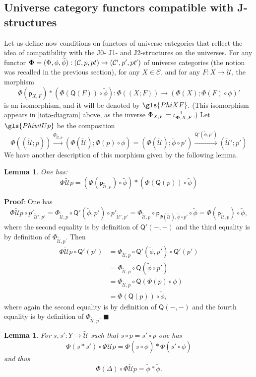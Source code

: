 \documentclass[12pt]{article}
\numberwithin{equation}{section}
\newenvironment{myproof}{{\bf Proof}:}{$\blacksquare$ \vskip 5mm }
\newtheorem{lemma}[proposition]{Lemma}
\newcommand{\sr}{\rightarrow}
\newcommand{\lr}{\longrightarrow}
\newcommand{\wt}{\widetilde}
\newcommand{\C}{{\mathcal C}}  %
\newcommand{\p}{\mathsf{p}}
\newcommand{\U}{\mathcal{U}}
\newcommand{\Q}{\mathsf{Q}}
\begin{document}
\subsection{Universe category functors compatible with J-structures}


Let us define now conditions on functors of universe categories that reflect
the idea of compatibility with the J0- J1- and J2-structures on the
universes. 
For any functor ${\bf\Phi} = (\Phi,\phi,\wt{\phi}) : ({\C},p,pt) \to ({\C}',p',pt') $ of universe categories (the notion
was recalled in the previous section), for any $X\in \C$, and for any $F:X\sr \U$, the morphism
%
$$\Phi(\p_{X,F})*(\Phi(\Q(F))\circ\wt{\phi}):\Phi((X;F))\sr
(\Phi(X);\Phi(F)\circ\phi)'$$
%
is an isomorphism, and it will be denoted by $\gls{PhiXF}$.
(This isomorphism appears in \ref{iota-diagram} above, as the inverse $\Phi_{X,F} = \iota_{{\bf\Phi},X,F}^{-1}$.)
Let $\gls{PhiwtUp}$ be the composition
%
$$\Phi((\wt{\U};p)) \stackrel{\Phi_{\wt{\U},p}}{\lr} (\Phi(\wt{\U});\Phi(p)\circ
\phi)=(\Phi(\wt{\U});\wt{\phi}\circ p')\stackrel{\Q'(\wt{\phi},p')}{\lr}
(\wt{\U}';p')$$
%
We have another description of this morphism given by the following lemma.
%
\begin{lemma}
\label{2015.04.10.l5} One has:
%
$$\Phi\wt{\U}p=(\Phi(\p_{\wt{\U},p})\circ\wt{\phi})*(\Phi(\Q(p))\circ\wt{\phi})$$
%
\end{lemma}
%
\begin{myproof}
One has
%
$$\Phi\wt{\U}p\circ p'_{\wt{\U}',p'}=\Phi_{\wt{\U},p}\circ \Q'(\wt{\phi},p')\circ
p'_{\wt{\U}',p'} =\Phi_{\wt{\U},p}\circ \p_{\Phi(\wt{\U}),\wt{\phi}\circ
  p'}\circ\wt{\phi}=\Phi(\p_{\wt{\U},p})\circ \wt{\phi},$$
%
where the second equality is by definition of $\Q'(-,-)$ and the third equality
is by definition of $\Phi_{\wt{\U},p}$. Then
%
\begin{align*}
  \Phi\wt{\U}p\circ \Q'(p')
    & = \Phi_{\wt{\U},p}\circ \Q'(\wt{\phi},p')\circ \Q'(p') \\
    & = \Phi_{\wt{\U},p}\circ \Q(\wt{\phi}\circ p') \\
    & = \Phi_{\wt{\U},p}\circ \Q(\Phi(p)\circ \phi) \\
    & = \Phi(\Q(p))\circ \wt{\phi},
\end{align*}
%
where again the second equality is by definition of $\Q(-,-)$ and the fourth
equality is by definition of $\Phi_{\wt{\U},p}$.
\end{myproof}
%
\begin{lemma}
\label{2015.04.10.l6} For $s,s':Y\sr \wt{\U}$ such that $s\circ p=s'\circ p$
one has
%
$$\Phi(s*s')\circ\Phi\wt{\U}p=\Phi(s\circ \wt{\phi})*\Phi(s'\circ\wt{\phi})$$
%
and thus
%
$$\Phi(\Delta)\circ \Phi\wt{\U}p = \wt{\phi}*\wt{\phi}.$$
%
\end{lemma}
\end{document}
